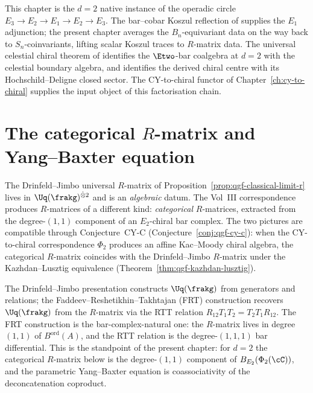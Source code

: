 \begin{remark}
\label{rem:bf-programme-location}
This chapter is the $d = 2$ native instance of the operadic circle
$E_3 \to E_2 \to E_1 \to E_2 \to E_3$. The bar--cobar Koszul
reflection of \cite{VolI} supplies the $E_1$ adjunction; the present
chapter averages the $B_n$-equivariant data on the way back to
$S_n$-coinvariants, lifting scalar Koszul traces to $R$-matrix data.
The universal celestial chiral theorem of \cite{VolII} identifies the
$\Etwo$-bar coalgebra at $d = 2$ with the celestial boundary algebra,
and identifies the derived chiral centre with its Hochschild--Deligne
closed sector. The CY-to-chiral functor of
Chapter~\ref{ch:cy-to-chiral} supplies the input object of this
factorisation chain.
\end{remark}

\section{The categorical \texorpdfstring{$R$}{R}-matrix and Yang--Baxter equation}
\label{sec:bf-categorical-r-matrix}

The Drinfeld--Jimbo universal $R$-matrix of
Proposition~\ref{prop:qgf-classical-limit-r} lives in $\Uq(\frakg)^{\hat\otimes 2}$
and is an \emph{algebraic} datum. The Vol~III correspondence produces $R$-matrices
of a different kind: \emph{categorical} $R$-matrices, extracted from the
degree-$(1,1)$ component of an $E_2$-chiral bar complex. The two pictures
are compatible through Conjecture~CY-C (Conjecture~\ref{conj:qgf-cy-c}):
when the CY-to-chiral correspondence $\Phi_2$ produces an affine Kac--Moody chiral algebra,
the categorical $R$-matrix coincides with the Drinfeld--Jimbo $R$-matrix
under the Kazhdan--Lusztig equivalence (Theorem~\ref{thm:qgf-kazhdan-lusztig}).

\begin{remark}
\label{rem:bf-dj-vs-frt}
The Drinfeld--Jimbo presentation constructs $\Uq(\frakg)$ from generators
and relations; the Faddeev--Reshetikhin--Takhtajan (FRT) construction
recovers $\Uq(\frakg)$ from the $R$-matrix via the RTT relation
$R_{12} T_1 T_2 = T_2 T_1 R_{12}$. The FRT construction is the
bar-complex-natural one: the $R$-matrix lives in degree $(1,1)$ of
$B^{\mathrm{ord}}(A)$, and the RTT relation is the
degree-$(1,1,1)$ bar differential. This is the standpoint
of the present chapter: for $d=2$ the categorical $R$-matrix below is the
degree-$(1,1)$ component of $B_{E_2}(\Phi_2(\cC))$, and the parametric
Yang--Baxter equation is coassociativity of the deconcatenation coproduct.
\end{remark}

